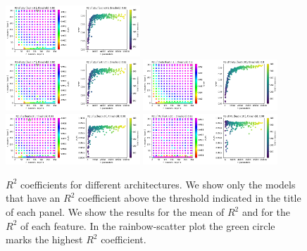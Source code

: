 \documentclass[prd,aps,twocolumn,a4paper,showkeys,nofootinbib]{revtex4-1}
\begin{document}
\begin{figure}[t]
  \hspace{0.3cm}
  \includegraphics[width=0.45\textwidth]{./Figs/crossval_v0c0_R2s2y.png} \\
  \includegraphics[width=0.45\textwidth]{./Figs/crossval_v0c0_R2s2z.png} 
  \hspace{0.3cm}
  \includegraphics[width=0.45\textwidth]{./Figs/crossval_v0c0_R2theta.png} \\
  \includegraphics[width=0.45\textwidth]{./Figs/crossval_v0c0_R2q.png} 
  \hspace{0.3cm}
  \includegraphics[width=0.45\textwidth]{./Figs/crossval_v0c0_R2Mc.png} 
  \caption{\label{fig:crossval_v0c0} $R^2$ coefficients for different architectures. 
  We show only the models that have an $R^2$ coefficient
  above the threshold indicated in the title of each panel. We show the results
  for the mean of $R^2$ and for the $R^2$ of each feature. In the rainbow-scatter plot
  the green circle marks the highest $R^2$ coefficient. }
\end{figure}
%

\end{document}
